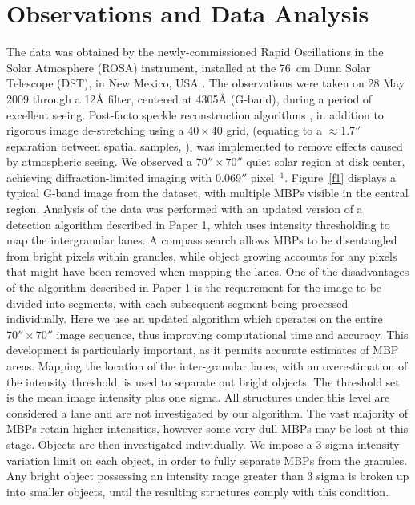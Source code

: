 \documentclass{emulateapj}
\begin{document}
\section{Observations and Data Analysis}
\label{data}    
The data was obtained by the newly-commissioned Rapid Oscillations in the Solar Atmosphere (ROSA) instrument, installed at the 76~cm Dunn Solar Telescope (DST), in New Mexico, USA \citep[]{Jess10}. The observations were taken on 28 May 2009 through a 12{\AA} filter, centered at 4305{\AA} (G-band), during a period of excellent seeing. Post-facto speckle reconstruction algorithms \cite[]{Wog08}, in addition to rigorous image de-stretching using a $40 \times 40$ grid, (equating to a $\approx$1.7$''$ separation between spatial samples, \citep{Jes08}), was implemented to remove effects caused by atmospheric seeing. We observed a $70'' \times 70''$ quiet solar region at disk center, achieving diffraction-limited imaging with 0.069$''$ pixel$^{-1}$. Figure~\ref{f1} displays a typical G-band image from the dataset, with multiple MBPs visible in the central region.
Analysis of the data was performed with an updated version of a detection algorithm described in Paper 1, which uses intensity thresholding to map the intergranular lanes. A compass search allows MBPs to be disentangled from bright pixels within granules, while object growing accounts for any pixels that might have been removed when mapping the lanes. One of the disadvantages of the algorithm described in Paper 1 is the requirement for the image to be divided into segments, with each subsequent segment being processed individually. Here we use an updated algorithm which operates on the entire $70'' \times 70''$ image sequence, thus improving computational time and accuracy.  This development is particularly important, as it permits accurate estimates of MBP areas. 
Mapping the location of the inter-granular lanes, with an overestimation of the intensity threshold, is used to separate out bright objects.  The threshold set is the mean image intensity plus one sigma. All structures under this level are considered a lane and are not investigated by our algorithm.  The vast majority of MBPs retain higher intensities, however some very dull MBPs may be lost at this stage.  Objects are then investigated individually. We impose a 3-sigma intensity variation limit on each object, in order to fully separate MBPs from the granules.  Any bright object possessing an intensity range greater than 3 sigma is broken up into smaller objects, until the resulting structures comply with this condition.
\end{document}
